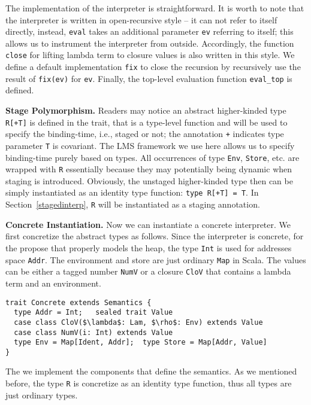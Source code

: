 The implementation of the interpreter is straightforward.
It is worth to note that the interpreter is written in open-recursive style -- 
it can not refer to itself directly, instead, \texttt{eval} takes an additional 
parameter \texttt{ev} referring to itself; this allows us to instrument the interpreter
from outside. Accordingly, the function \texttt{close} for lifting lambda term to closure values
is also written in this style.
We define a default implementation \texttt{fix} to close the recursion by recursively use the result 
of \texttt{fix(ev)} for \texttt{ev}. 
Finally, the top-level evaluation function \texttt{eval\_top} is defined.

\textbf{Stage Polymorphism.}
Readers may notice an abstract higher-kinded type \texttt{R[+T]} is defined in the trait, that is a
type-level function and will be used to specify the binding-time, i.e., staged or not; the annotation 
\texttt{+} indicates type parameter \texttt{T} is covariant.
The LMS framework we use here allows us to specify binding-time purely based on types.
All occurrences of type \texttt{Env}, \texttt{Store}, etc. are wrapped with \texttt{R} 
essentially because they may potentially being dynamic when staging is introduced.
Obviously, the unstaged higher-kinded type then can be simply instantiated as an identity type function: 
\texttt{type R[+T] = T}. In Section~\ref{stagedinterp}, \texttt{R} will be instantiated 
as a staging annotation. 

\textbf{Concrete Instantiation.}
Now we can instantiate a concrete interpreter. We first concretize the abstract types as follows.
Since the interpreter is concrete, for the propose that properly models the heap, the type \texttt{Int} 
is used for addresses space \texttt{Addr}. The environment and store are just ordinary \texttt{Map} in Scala.
The values can be either a tagged number \texttt{NumV} or a closure \texttt{CloV} that contains a lambda term
and an environment.

\begin{lstlisting}
trait Concrete extends Semantics {
  type Addr = Int;   sealed trait Value
  case class CloV($\lambda$: Lam, $\rho$: Env) extends Value
  case class NumV(i: Int) extends Value
  type Env = Map[Ident, Addr];  type Store = Map[Addr, Value]
}
\end{lstlisting}

The we implement the components that define the semantics. 
As we mentioned before, the type \texttt{R} is concretize as an identity type function, thus
all types are just ordinary types.


